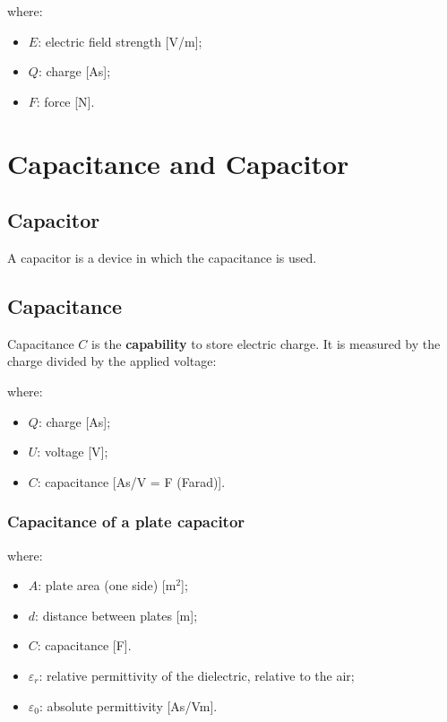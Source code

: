 \documentclass{article}
\begin{document}
where:
\begin{itemize}
    \item $E$: electric field strength [V/m];
    \item $Q$: charge [As];
    \item $F$: force [N].
\end{itemize}

\newpage
\section{Capacitance and Capacitor}
\subsection{Capacitor}
A capacitor is a device in which the capacitance is used.

\subsection{Capacitance}
Capacitance $C$ is the \textbf{capability} to store electric charge.
It is measured by the charge divided by the applied voltage:

where:
\begin{itemize}
    \item $Q$: charge [As];
    \item $U$: voltage [V];
    \item $C$: capacitance [As/V = F (Farad)].
\end{itemize}

\subsubsection{Capacitance of a plate capacitor}

where:
\begin{itemize}
    \item $A$: plate area (one side) [m$^2$];
    \item $d$: distance between plates [m];
    \item $C$: capacitance [F].
\end{itemize}

\begin{itemize}
    \item $\varepsilon_r$: relative permittivity of the dielectric, relative to the air;
    \item $\varepsilon_0$: absolute permittivity [As/Vm].
\end{itemize}
\end{document}
